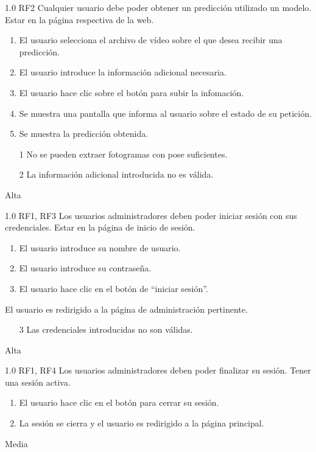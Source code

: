 {1.0}
{RF2}
{Cualquier usuario debe poder obtener un predicción utilizado un modelo.}
{Estar en la página respectiva de la web.}
{
    \begin{enumerate}
        \def\labelenumi{\arabic{enumi}.}
        \tightlist
        \item El usuario selecciona el archivo de vídeo sobre el que desea
              recibir una predicción.
        \item El usuario introduce la información adicional necesaria.
        \item El usuario hace clic sobre el botón para subir la infomación.
        \item Se muestra una pantalla que informa al usuario sobre el estado de
              su petición.
        \item Se muestra la predicción obtenida.
    \end{enumerate}
}
{}
{
    \begin{itemize}
        \item [1] No se pueden extraer fotogramas con pose suficientes.
        \item [2] La información adicional introducida no es válida.
    \end{itemize}
}
{Alta}

{1.0}
{RF1, RF3}
{Los usuarios administradores deben poder iniciar sesión con sus credenciales.}
{Estar en la página de inicio de sesión.}
{
    \begin{enumerate}
        \def\labelenumi{\arabic{enumi}.}
        \tightlist
        \item El usuario introduce su nombre de usuario.
        \item El usuario introduce su contraseña.
        \item El usuario hace clic en el botón de ``iniciar sesión''.
    \end{enumerate}
}
{El usuario es redirigido a la página de administración pertinente.}
{
    \begin{itemize}
        \item [3] Las credenciales introducidas no son válidas.
    \end{itemize}
}
{Alta}

{1.0}
{RF1, RF4}
{Los usuarios administradores deben poder finalizar su sesión.}
{Tener una sesión activa.}
{
    \begin{enumerate}
        \def\labelenumi{\arabic{enumi}.}
        \tightlist
        \item El usuario hace clic en el botón para cerrar su sesión.
        \item La sesión se cierra y el usuario es redirigido a la página principal.
    \end{enumerate}
}
{}
{}
{Media}

